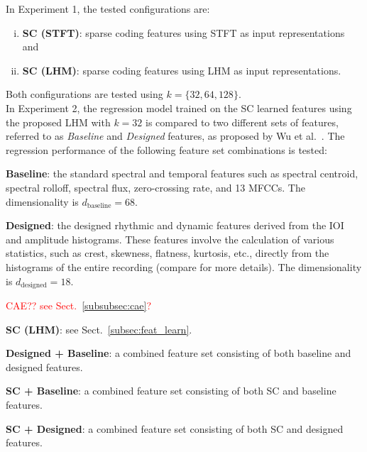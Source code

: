 \documentclass{ws-ijsc}
\newcommand{\highlight}[1]{\textcolor{red}{#1}}
\begin{document}
In Experiment 1, the tested configurations are:%
\begin{enumerate}[(i)]
\item \textbf{SC (STFT)}: sparse coding features using STFT as input representations and
\item \textbf{SC (LHM)}: sparse coding features using LHM as input representations.
\end{enumerate}
Both configurations are tested using $k = \{32, 64, 128\}$.\\

In Experiment 2, the regression model trained on the SC learned features using the proposed LHM with $k = 32$ is compared to two different sets of features, referred to as \textit{Baseline} and \textit{Designed} features, as proposed by Wu et al.~\cite{Wu2016}. The regression performance of the following feature set combinations is tested:
\begin{enumerate}[(i)]
\item \textbf{Baseline}: the standard spectral and temporal features such as spectral centroid, spectral rolloff, spectral flux, zero-crossing rate, and 13 MFCCs. The dimensionality is $d_\mathrm{baseline} = 68$.
\item \textbf{Designed}: the designed rhythmic and dynamic features derived from the IOI and amplitude histograms. These features involve the calculation of various statistics, such as crest, skewness, flatness, kurtosis, etc., directly from the histograms of the entire recording (compare \cite{Wu2016} for more details). The dimensionality is $d_\mathrm{designed} = 18$. 
\highlight{\item  CAE?? see Sect.~\ref{subsubsec:cae}?}
\item \textbf{SC (LHM)}: see Sect.~\ref{subsec:feat_learn}. %
\item \textbf{Designed + Baseline}: a combined feature set consisting of both baseline and designed features. %
\item \textbf{SC + Baseline}:  a combined feature set consisting of both SC and baseline features.
\item \textbf{SC + Designed}:  a combined feature set consisting of both SC and designed features.
\end{enumerate}
\end{document}
